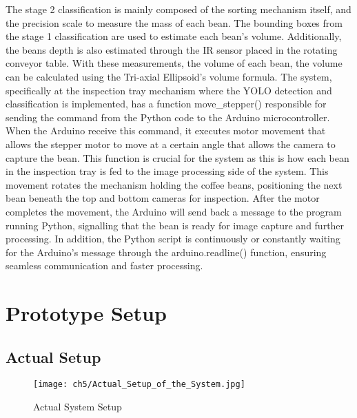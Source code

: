The stage 2 classification is mainly composed of the sorting mechanism itself, and the precision scale to measure the mass of each bean. The bounding boxes from the stage 1 classification are used to estimate each bean’s volume. Additionally, the beans depth is also estimated through the IR sensor placed in the rotating conveyor table. With these measurements, the volume of each bean, the volume can be calculated using the Tri-axial Ellipsoid’s volume formula.
The system, specifically at the inspection tray mechanism where the YOLO detection and classification is implemented, has a function move\_stepper() responsible for sending the command from the Python code to the Arduino microcontroller. When the Arduino receive this command, it executes motor movement that allows the stepper motor to move at a certain angle that allows the camera to capture the bean. This function is crucial for the system as this is how each bean in the inspection tray is fed to the image processing side of the system. This movement rotates the mechanism holding the coffee beans, positioning the next bean beneath the top and bottom cameras for inspection. After the motor completes the movement, the Arduino will send back a message to the program running Python, signalling that the bean is ready for image capture and further processing. In addition, the Python script is continuously or constantly waiting for the Arduino’s message through the arduino.readline() function, ensuring seamless communication and faster processing. 

\section{Prototype Setup}
\subsection{Actual Setup}

\begin{figure}[H]
    \centering
    \texttt{[image: ch5/Actual\_Setup\_of\_the\_System.jpg]}
    \caption{Actual System Setup}
    \label{fig:actual_setup}
\end{figure}

